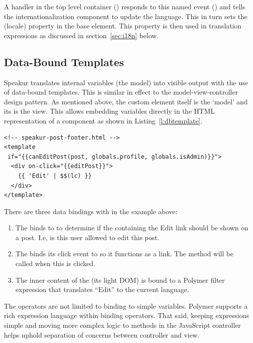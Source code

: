 A handler in the top level container () responds to this named event () and tells the internationalization component to update the language.
This in turn sets the  (locale) property in the base element.
This property is then used in translation expressions as discussed in section~\ref{sec:i18n} below.

\subsection{Data-Bound Templates}
Speakur translates internal variables (the model) into visible output with the use of data-bound templates.
This is similar in effect to the model-view-controller design pattern.
As mentioned above, the custom element itself is the `model' and its  is the view.
This allows embedding variables directly in the HTML representation of a component as shown in Listing~\ref{l:dbtemplate}.

\begin{lstlisting}[language=HTML5,caption={User interface control with data bindings (edit post link).},label=l:bind_ui,captionpos=below]
<!-- speakur-post-footer.html -->
<template 
 if="{{canEditPost(post, globals.profile, globals.isAdmin)}}">
  <div on-click="{{editPost}}">
    {{ 'Edit' | $$(lc) }}
  </div>
</template>
\end{lstlisting}

There are three data bindings with \tcode{\{\{ \}\}} in the example above:
\begin{enumerate}
\item The  binds to  to determine if the  containing the Edit link should be shown on a post. I.e, is this user allowed to edit this post.
\item The  binds its click event to  so it functions as a link. The  method will be called when this is clicked.
\item The inner content of the  (its light DOM) is bound to a Polymer filter expression that translates ``Edit'' to the current language. 
\end{enumerate}

The \tcode{\{\{ \}\}} operators are not limited to binding to simple variables.
Polymer supports a rich expression language within binding operators. 
That said, keeping  expressions simple and moving more complex logic to methods in the JavaScript controller helps uphold separation of concerns between controller and view.

